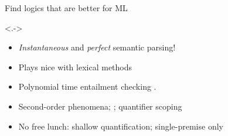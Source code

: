 \begin{frame}{Find logics that are better for ML}
\begin{center}
\end{center}
\footnotetext<.->{\cite{key:1991valencia-natlog,key:2008maccartney-natlog,key:2014icard-natlog}}
\pause

\begin{itemize}
\item \textit{Instantaneous} and \textit{perfect} semantic parsing!
\item Plays nice with lexical methods
\end{itemize}
\vspace{1ex}
\pause

\begin{itemize}
\item Polynomial time entailment checking \cite{key:2008maccartney-natlog}.
\end{itemize}
\vspace{1ex}
\pause

\begin{itemize}
\item Second-order phenomena; ; quantifier scoping
\pause
\item No free lunch: shallow quantification; single-premise only
\end{itemize}
\end{frame}
